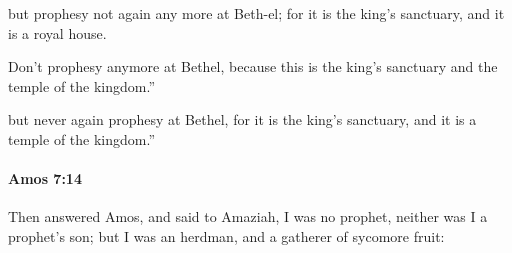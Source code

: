 			\begin{versebox}
					\item[BHS] 
					\item[LXX] 
					\item[ASV] but prophesy not again any more at Beth-el; for it is the king's sanctuary, and it is a royal house.
					\item[NIV] Don’t prophesy anymore at Bethel, because this is the king’s sanctuary and the temple of the kingdom.”
					\item[NRSV] but never again prophesy at Bethel, for it is the king’s sanctuary, and it is a temple of the kingdom.”
			\end{versebox}

		\paragraph{Amos 7:14} %
			\label{AMOS-7-14}

			Then answered Amos, and said to Amaziah, I was no prophet, neither was I a prophet’s son; but I was an herdman, and a gatherer of sycomore fruit:

